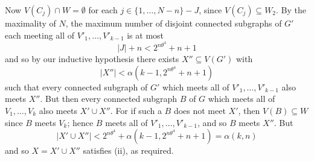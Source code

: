 Now $V(C_j) \cap W = \emptyset$ for each $j \in \{1, \dots, N - n\} - J$, since $V(C_j) \subseteq W_2$. By the maximality of $N$, the maximum number of disjoint connected subgraphs of $G'$ each meeting all of $V'_1, \dots, V'_{k-1}$ is at most
\begin{equation*}
|J| + n < 2^{n\theta^4} + n + 1
\end{equation*}
and so by our inductive hypothesis there exists $X'' \subseteq V(G')$ with
\begin{equation*}
|X''| < \alpha(k - 1, 2^{n\theta^4} + n + 1)
\end{equation*}
such that every connected subgraph of $G'$ which meets all of $V'_1, \dots, V'_{k-1}$ also meets $X''$. But then every connected subgraph $B$ of $G$ which meets all of $V_1, \dots, V_k$ also meets $X' \cup X''$. For if such a $B$ does not meet $X'$, then $V(B) \subseteq W$ since $B$ meets $V_k$; hence $B$ meets all of $V'_1, \dots, V'_{k-1}$, and so $B$ meets $X''$. But
\begin{equation*}
|X' \cup X''| < 2^{n\theta^4} + \alpha(k - 1, 2^{n\theta^4} + n + 1) = \alpha(k, n)
\end{equation*}
and so $X = X' \cup X''$ satisfies (ii), as required.
